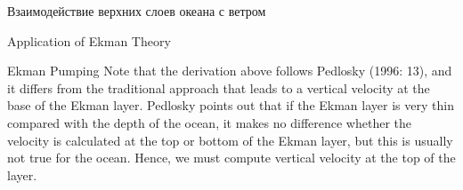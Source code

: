 \begin{chapter}{Взаимодействие верхних слоев океана с ветром}
\begin{section}{Application of Ekman Theory}
\begin{paragraph}{Ekman Pumping}
Note that the derivation above follows Pedlosky (1996: 13), and it
differs from the traditional approach that leads to a vertical
velocity at the base of the Ekman layer. Pedlosky points out that if
the Ekman layer is very thin compared with the depth of the ocean, it
makes no difference whether the velocity is calculated at the top or
bottom of the Ekman layer, but this is usually not true for the ocean.
Hence, we must compute vertical velocity at the top of the
layer.
%


\end{paragraph}
\end{section}
\end{chapter}
